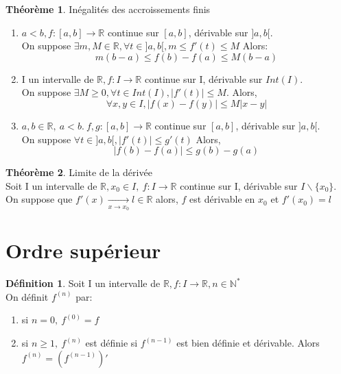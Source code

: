 \documentclass[fleqn]{article}
\theoremstyle{definition} \newtheorem*{defi}{D\'efinition}
\theoremstyle{definition} \newtheorem*{theo}{Th\'eor\`eme}
\theoremstyle{remark} \newtheorem*{rqs}{Remarques}
\theoremstyle{definition} \newtheorem*{prop}{Propri\'et\'e}
\begin{document}
\begin{theo} In\'egalit\'es des accroissements finis
	\begin{enumerate}
		\item $a<b, f:[a,b] \rightarrow \mathbb{R}$ continue sur $[a,b]$, d\'erivable sur $]a,b[$.\\
			On suppose $\exists m,M \in \mathbb{R}, \forall t \in ]a,b[, m \leq f'(t) \leq M$ Alors:
			\[m(b-a) \leq f(b) - f(a) \leq M(b-a)\]
		\item I un intervalle de $\mathbb{R}, f:I \rightarrow \mathbb{R}$ continue sur I, d\'erivable sur $Int(I)$.\\
			On suppose $\exists M\geq 0, \forall t \in Int(I), |f'(t)| \leq M$. Alors,
			\[\forall x,y \in I, |f(x) - f(y)| \leq M|x-y|\]
		\item $a,b \in \mathbb{R},\ a<b.\ f,g:[a,b] \rightarrow \mathbb{R}$ continue sur $[a,b]$, d\'erivable sur $]a,b[$.\\
			On suppose $\forall t \in ]a,b[, |f'(t)| \leq g'(t)$ Alors,
			\[|f(b) - f(a)| \leq g(b) - g(a)\]
	\end{enumerate}
\end{theo}

\begin{theo} Limite de la d\'eriv\'ee \\
	Soit I un intervalle de $\mathbb{R}, x_0 \in I,\ f:I\rightarrow \mathbb{R}$ continue sur I, d\'erivable sur $I\backslash\{x_0\}$.\\
	On suppose que $f'(x) \underset{x \rightarrow x_0}{\rightarrow} l \in \mathbb{R}$ alors, $f$ est d\'erivable en $x_0$ et $f'(x_0) = l$
\end{theo}

\section{Ordre sup\'erieur}
\begin{defi}
	Soit I un intervalle de $\mathbb{R}, f:I \rightarrow \mathbb{R}, n \in \mathbb{N}^{*}$ \\
	On d\'efinit $f^{(n)}$ par:
	\begin{enumerate}
		\item si $n = 0,\ f^{(0)} = f$
		\item si $n \geq 1,\ f^{(n)}$ est d\'efinie si $f^{(n-1)}$ est bien d\'efinie et d\'erivable. Alors $f^{(n)} = (f^{(n-1)})'$
	\end{enumerate}
\end{defi}
\end{document}
